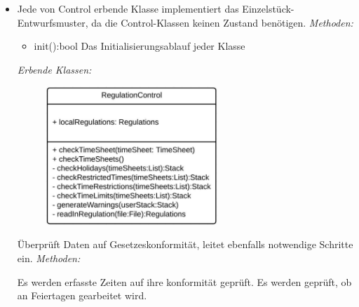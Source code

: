         \begin{itemize}
            \item Jede von Control erbende Klasse implementiert das Einzelstück-Entwurfsmuster, da die Control-Klassen keinen Zustand benötigen.
            \newline
                \emph{Methoden:}
                \begin{itemize}
                    \item{init():bool}
                        Das Initialisierungsablauf jeder Klasse
                \end{itemize}
                \emph{Erbende Klassen:}
                \begin{itemize}
                    \begin{figure}[htb]
                    \centering
                    \includegraphics[width=6.5cm]{Diagramms/class/singleclass/ControlReg.pdf}
                    \end{figure}
                    \newline
                       Überprüft Daten auf Gesetzeskonformität, leitet ebenfalls notwendige Schritte ein.
                                                          \newline
                    \emph{Methoden:}
                       \begin{itemize}
                            Es werden erfasste Zeiten auf ihre konformität geprüft.
                            Es werden geprüft, ob an Feiertagen gearbeitet wird.
                            
                            

\end{itemize}
\end{itemize}
\end{itemize}
